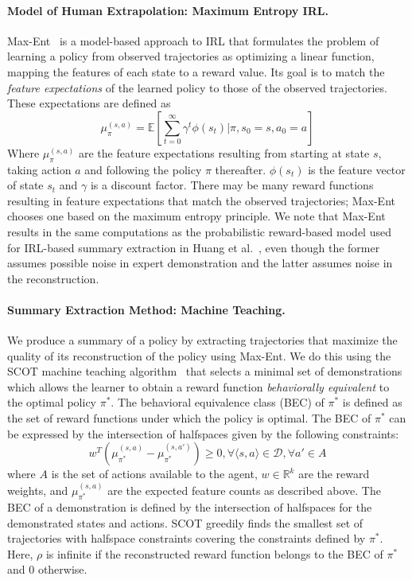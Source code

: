 \documentclass{article}
\begin{document}
\paragraph{Model of Human Extrapolation: Maximum Entropy IRL.}
Max-Ent~\cite{ziebart2008maximum} is a model-based approach to IRL that formulates the problem of learning a policy from observed trajectories as optimizing a linear function, mapping the features of each state to a reward value. Its goal is to match the \emph{feature expectations} of the learned policy to those of the observed trajectories. These expectations are defined as 
\begin{equation}\label{eq_safcount}
 \mu_\pi^{(s,a)} = \mathbb{E}[
 \sum_{t=0}^{\infty} \gamma^t\phi(s_t)|\pi, s_0=s, a_0=a]
\end{equation} 
Where $\mu_\pi^{(s,a)}$ are the feature expectations resulting from starting at state $s$, taking action $a$ and following the policy $\pi$ thereafter. $\phi(s_t)$ is the feature vector of state $s_t$ and $\gamma$ is a discount factor. There may be many reward functions resulting in feature expectations that match the observed trajectories; Max-Ent chooses one based on the maximum entropy principle. We note that Max-Ent results in the same computations as the probabilistic reward-based model used for IRL-based summary extraction in Huang et al.~, even though the former assumes possible noise in expert demonstration and the latter assumes noise in the reconstruction.

\paragraph{Summary Extraction Method: Machine Teaching.}
We produce a summary of a policy by extracting trajectories that maximize the quality of its reconstruction of the policy using Max-Ent. We do this using the SCOT machine teaching algorithm~\cite{brown2018machineteachingirl} that selects a minimal set of demonstrations which allows the learner to obtain a reward function \textit{behaviorally equivalent} to the optimal policy $\pi^*$. The behavioral equivalence class (BEC) of $\pi^*$ is defined as the set of reward functions under which the policy is optimal. The BEC of $\pi^*$ can be expressed by the intersection of halfspaces given by the following constraints:
\begin{equation}\label{eq_BEC}
 w^T(\mu_{\pi^*}^{(s,a)} - \mu_{\pi^*}^{(s,a')}) \geq 0, 
 \forall \langle s , a \rangle \in \mathcal{D}, \forall a' \in A
\end{equation}
where $A$ is the set of actions available to the agent, $w\in\mathbb{R}^k$ are the reward weights, and $\mu_{\pi^*}^{(s,a)}$ are the expected feature counts as described above. The BEC of a demonstration is defined by the intersection of halfspaces for the demonstrated states and actions. SCOT greedily finds the smallest set of trajectories with halfspace constraints covering the constraints defined by $\pi^*$. Here, $\rho$ is infinite if the reconstructed reward function belongs to the BEC of $\pi^*$ and 0 otherwise.
\end{document}
